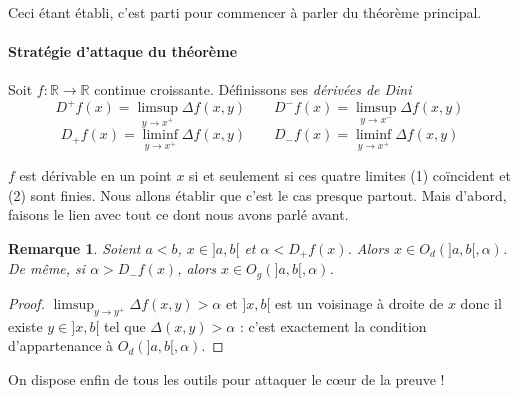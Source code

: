 \documentclass[a4paper, 11pt]{article}
\def\R{\mathbb{R}}
\newtheorem*{remark}{Remarque}
\begin{document}
Ceci étant établi, c'est parti pour commencer à parler du théorème principal.

\paragraph{Stratégie d'attaque du théorème}
Soit $f : \R \to \R$ continue croissante. Définissons ses \emph{dérivées de Dini}
\[ D^+f(x) = \limsup_{y \to x^+} \Delta f(x,y) \qquad
  D^-f(x) = \limsup_{y \to x^-} \Delta f(x,y) \]
\[  D_+f(x) = \liminf_{y \to x^+} \Delta f(x,y) \qquad
  D_-f(x) = \liminf_{y \to x^+} \Delta f(x,y) \]

$f$ est dérivable en un point $x$ si et seulement si ces quatre limites (1)
coïncident et (2) sont finies. Nous allons établir que c'est le cas presque
partout. Mais d'abord, faisons le lien avec tout ce dont nous avons parlé avant.

\begin{remark}
  Soient $a < b$, $x \in ]a,b[$ et $\alpha < D_+f(x)$. Alors $x \in O_d(]a,b[,
  \alpha)$. De même, si $\alpha > D_-f(x)$, alors $x \in O_g(]a,b[, \alpha)$.
\end{remark}
\begin{proof}
  $\limsup_{y \to y^+} \Delta f(x,y) > \alpha$ et $]x,b[$ est un voisinage à
  droite de $x$ donc il existe $y \in ]x,b[$ tel que $\Delta(x,y) > \alpha$ :
  c'est exactement la condition d'appartenance à $O_d(]a,b[,\alpha)$.
\end{proof}

On dispose enfin de tous les outils pour attaquer le cœur de la preuve !
\end{document}
